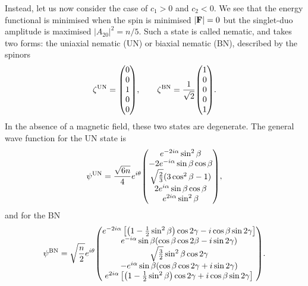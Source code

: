 Instead, let us now consider the case of \(c_1 > 0\) and \(c_2 < 0\).
We see that the energy functional is minimised when the spin is minimised
\(|\vb{F}| = 0\) but the singlet-duo amplitude is maximised
\(|A_{20}|^2 = n/5\).
Such a state is called nematic, and takes two forms: the uniaxial nematic (UN)
or biaxial nematic (BN), described by the spinors
\begin{equation}
    \zeta^\mathrm{UN} = \mqty(0 \\ 0 \\ 1 \\ 0 \\ 0), \qquad
    \zeta^\mathrm{BN} = \frac{1}{\sqrt{2}}\mqty(1 \\ 0 \\0 \\ 0 \\ 1).
\end{equation}
In the absence of a magnetic field, these two states are degenerate.
The general wave function for the UN state is
\begin{equation}
    \psi^\mathrm{UN} = \frac{\sqrt{6n}}{4}e^{i\theta}\mqty(
        e^{-2i\alpha} \sin^2\beta \\
        -2e^{-i\alpha} \sin\beta \cos\beta \\
        \sqrt{\frac{2}{3}}(3\cos^2\beta - 1) \\
        2e^{i\alpha} \sin\beta \cos\beta \\
        e^{2i\alpha} \sin^2\beta
    ),
\end{equation}
and for the BN
\begin{equation}
    \psi^\mathrm{BN} = \sqrt{\frac{n}{2}}e^{i\theta} \mqty(
        e^{-2i\alpha}\left[\left(1 - \frac{1}{2}\sin^2\beta\right)\cos 2\gamma
                            - i\cos\beta\sin 2\gamma\right] \\
        e^{-i\alpha}\sin\beta(\cos\beta\cos 2\beta - i\sin 2\gamma) \\
        \sqrt{\frac{3}{2}}\sin^2\beta \cos 2\gamma \\
        -e^{i\alpha}\sin\beta(\cos\beta\cos 2\gamma + i\sin 2\gamma) \\
        e^{2i\alpha}\left[\left(1 - \frac{1}{2}\sin^2\beta\right)\cos 2\gamma
                            + i\cos\beta\sin 2\gamma\right]
    ).
\end{equation}

